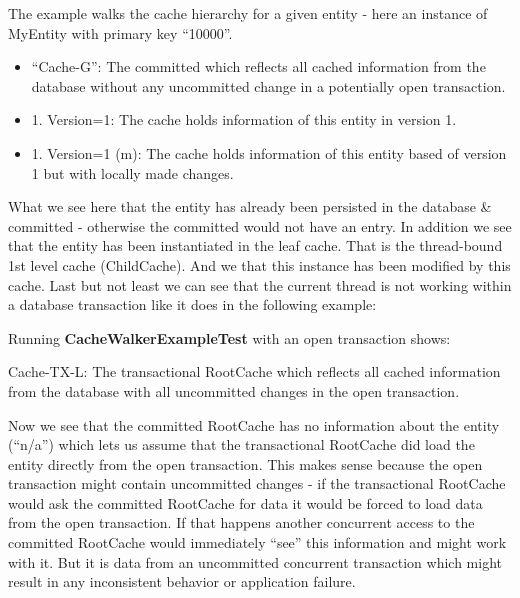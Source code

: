 The example walks the cache hierarchy for a given entity - here an instance of MyEntity with primary key ``10000''.
\begin{itemize}
	\item ``Cache-G'': The committed  which reflects all cached information from the database without any uncommitted change in a potentially open transaction.
	\item 1. Version=1: The cache holds information of this entity in version 1.
	\item 1. Version=1 (m): The cache holds information of this entity based of version 1 but with locally made changes.
\end{itemize}

What we see here that the entity has already been persisted in the database \& committed - otherwise the committed  would not have an entry. In addition we see that the entity has been instantiated in the leaf cache. That is the thread-bound 1st level cache (ChildCache). And we that this instance has been modified by this cache. Last but not least we can see that the current thread is not working within a database transaction like it does in the following example:\newline

Running \textbf{CacheWalkerExampleTest} with an open transaction shows:

Cache-TX-L: The transactional RootCache which reflects all cached information from the database with all uncommitted changes in the open transaction.\newline

Now we see that the committed RootCache has no information about the entity (``n/a'') which lets us assume that the transactional RootCache did load the entity directly from the open transaction. This makes sense because the open transaction might contain uncommitted changes - if the transactional RootCache would ask the committed RootCache for data it would be forced to load data from the open transaction. If that happens another concurrent access to the committed RootCache would immediately ``see'' this information and might work with it. But it is data from an uncommitted concurrent transaction which might result in any inconsistent behavior or application failure.